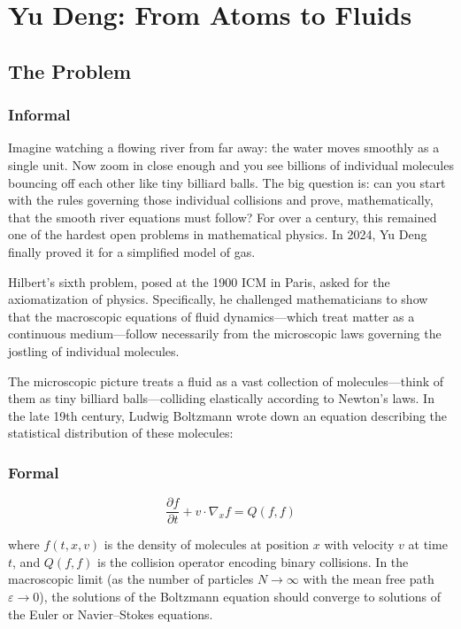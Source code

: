 \let\LocalMacro\relax

\chapter{Yu Deng: From Atoms to Fluids}

\section{The Problem}

\subsection{Informal}
Imagine watching a flowing river from far away: the water moves smoothly as a single unit. Now zoom in close enough and you see billions of individual molecules bouncing off each other like tiny billiard balls. The big question is: can you start with the rules governing those individual collisions and prove, mathematically, that the smooth river equations must follow? For over a century, this remained one of the hardest open problems in mathematical physics. In 2024, Yu Deng finally proved it for a simplified model of gas.

\begin{historicalbox}
Hilbert's sixth problem, posed at the 1900 ICM in Paris, asked for the axiomatization of physics. Specifically, he challenged mathematicians to show that the macroscopic equations of fluid dynamics---which treat matter as a continuous medium---follow necessarily from the microscopic laws governing the jostling of individual molecules.
\end{historicalbox}

The microscopic picture treats a fluid as a vast collection of molecules---think of them as tiny billiard balls---colliding elastically according to Newton's laws. In the late 19th century, Ludwig Boltzmann wrote down an equation describing the statistical distribution of these molecules:

\subsection{Formal}
\begin{equation}
\frac{\partial f}{\partial t} + v \cdot \nabla_x f = Q(f, f)
\end{equation}

where $f(t, x, v)$ is the density of molecules at position $x$ with velocity $v$ at time $t$, and $Q(f,f)$ is the collision operator encoding binary collisions. In the macroscopic limit (as the number of particles $N \to \infty$ with the mean free path $\varepsilon \to 0$), the solutions of the Boltzmann equation should converge to solutions of the Euler or Navier--Stokes equations.


